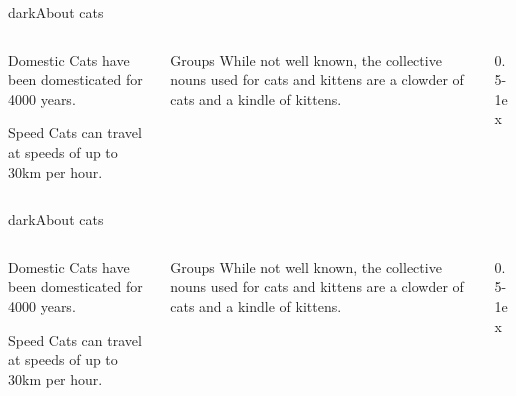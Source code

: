 \documentclass[aspectratio=169]{beamer}
\begin{document}

\begin{picframe}[darkbw]{dark}{About cats}
  \begin{columns}[t,onlytextwidth]
    \begin{column}{0.25\textwidth}
      \begin{block}{Domestic}
        Cats have been domesticated for 4000 years.
      \end{block}
      \begin{block}{Speed}
        Cats can travel at speeds of up to 30km per hour.
      \end{block}
    \end{column}
    \begin{column}{0.25\textwidth}
      \begin{block}{Groups}
        While not well known, the collective nouns used for cats and kittens are a clowder of cats and a kindle of kittens.
        \vspace*{5ex}
      \end{block}
    \end{column}
    \begin{column}{0.5\textwidth-1ex}
    \end{column}
  \end{columns}
\end{picframe}

\begin{picframe}[dark]{dark}{About cats}
  \begin{columns}[t,onlytextwidth]
    \begin{column}{0.25\textwidth}
      \begin{block}{Domestic}
        Cats have been domesticated for 4000 years.
      \end{block}
      \begin{block}{Speed}
        Cats can travel at speeds of up to 30km per hour.
      \end{block}
    \end{column}
    \begin{column}{0.25\textwidth}
      \begin{block}{Groups}
        While not well known, the collective nouns used for cats and kittens are a clowder of cats and a kindle of kittens.
      \end{block}
    \end{column}
    \begin{column}{0.5\textwidth-1ex}
    \end{column}
  \end{columns}
\end{picframe}
\end{document}
